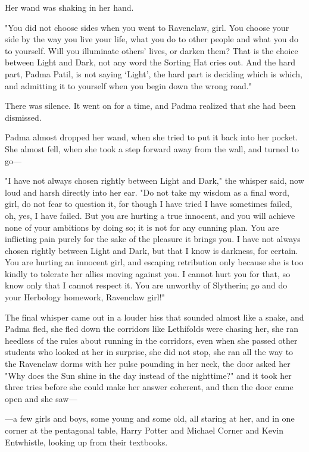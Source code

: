 Her wand was shaking in her hand.

"You did not choose sides when you went to Ravenclaw, girl. You choose your
side by the way you live your life, what you do to other people and what you do
to yourself. Will you illuminate others’ lives, or darken them? That is the
choice between Light and Dark, not any word the Sorting Hat cries out. And the
hard part, Padma Patil, is not saying ‘Light’, the hard part is deciding which
is which, and admitting it to yourself when you begin down the wrong road."

There was silence. It went on for a time, and Padma realized that she had been
dismissed.

Padma almost dropped her wand, when she tried to put it back into her pocket.
She almost fell, when she took a step forward away from the wall, and turned to
go—

"I have not always chosen rightly between Light and Dark," the whisper said,
now loud and harsh directly into her ear. "Do not take my wisdom as a final
word, girl, do not fear to question it, for though I have tried I have sometimes
failed, oh, yes, I have failed. But you are hurting a true innocent, and you
will achieve none of your ambitions by doing so; it is not for any cunning
plan. You are inflicting pain purely for the sake of the pleasure it brings
you. I have not always chosen rightly between Light and Dark, but that I know
is darkness, for certain. You are hurting an innocent girl, and escaping
retribution only because she is too kindly to tolerate her allies moving
against you. I cannot hurt you for that, so know only that I cannot respect it.
You are unworthy of Slytherin; go and do your Herbology homework, Ravenclaw
girl!"

The final whisper came out in a louder hiss that sounded almost like a snake,
and Padma fled, she fled down the corridors like Lethifolds were chasing her,
she ran heedless of the rules about running in the corridors, even when she
passed other students who looked at her in surprise, she did not stop, she ran
all the way to the Ravenclaw dorms with her pulse pounding in her neck, the
door asked her "Why does the Sun shine in the day instead of the nighttime?"
and it took her three tries before she could make her answer coherent, and then
the door came open and she saw—

—a few girls and boys, some young and some old, all staring at her, and in
one corner at the pentagonal table, Harry Potter and Michael Corner and Kevin
Entwhistle, looking up from their textbooks.

